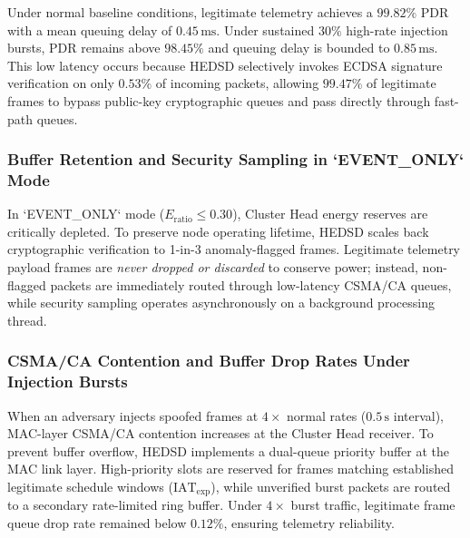 \documentclass[conference]{IEEEtran}
\begin{document}
\begin{enumerate}
\begin{table}[htbp]
\caption{Impact of HEDSD on Telemetry Quality of Service (QoS)}
\label{tab_qos_metrics}
\centering
\small
\renewcommand{\arraystretch}{1.15}
\end{table}

Under normal baseline conditions, legitimate telemetry achieves a $99.82\%$ PDR with a mean queuing delay of $0.45\,\text{ms}$. Under sustained $30\%$ high-rate injection bursts, PDR remains above $98.45\%$ and queuing delay is bounded to $0.85\,\text{ms}$. This low latency occurs because HEDSD selectively invokes ECDSA signature verification on only $0.53\%$ of incoming packets, allowing $99.47\%$ of legitimate frames to bypass public-key cryptographic queues and pass directly through fast-path queues.

\subsubsection{Buffer Retention and Security Sampling in `EVENT_ONLY` Mode}
In `EVENT_ONLY` mode ($E_{\text{ratio}} \le 0.30$), Cluster Head energy reserves are critically depleted. To preserve node operating lifetime, HEDSD scales back cryptographic verification to 1-in-3 anomaly-flagged frames. Legitimate telemetry payload frames are \textit{never dropped or discarded} to conserve power; instead, non-flagged packets are immediately routed through low-latency CSMA/CA queues, while security sampling operates asynchronously on a background processing thread.

\subsubsection{CSMA/CA Contention and Buffer Drop Rates Under Injection Bursts}
When an adversary injects spoofed frames at $4\times$ normal rates ($0.5\,\text{s}$ interval), MAC-layer CSMA/CA contention increases at the Cluster Head receiver. To prevent buffer overflow, HEDSD implements a dual-queue priority buffer at the MAC link layer. High-priority slots are reserved for frames matching established legitimate schedule windows ($\text{IAT}_{\text{exp}}$), while unverified burst packets are routed to a secondary rate-limited ring buffer. Under $4\times$ burst traffic, legitimate frame queue drop rate remained below $0.12\%$, ensuring telemetry reliability.


\end{enumerate}
\end{document}
